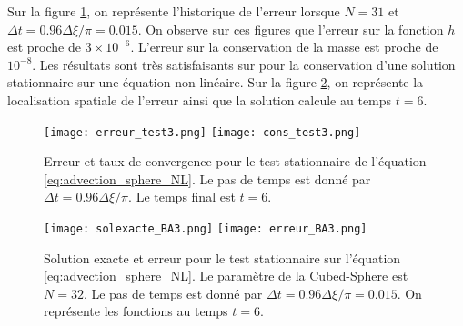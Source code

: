 Sur la figure \ref{fig:benartzi_test3_hist}, on représente l'historique de l'erreur lorsque $N=31$ et $\Delta t = 0.96 \Delta \xi / \pi = 0.015$. On observe sur ces figures que l'erreur sur la fonction $h$ est proche de $3 \times 10^{-6}$. L'erreur sur la conservation de la masse est proche de $10^{-8}$. Les résultats sont très satisfaisants sur pour la conservation d'une solution stationnaire sur une équation non-linéaire. Sur la figure \ref{fig:benartzi_test3_sol}, on représente la localisation spatiale de l'erreur ainsi que la solution calcule au temps $t=6$.

\begin{figure}[htbp]
\begin{center}
\texttt{[image: erreur\_test3.png]}
\texttt{[image: cons\_test3.png]}
\end{center}
\caption{Erreur et taux de convergence pour le test stationnaire de l'équation \eqref{eq:advection_sphere_NL}. Le pas de temps est donné par $\Delta t = 0.96 \Delta \xi / \pi$. Le temps final est $t=6$.}
\label{fig:benartzi_test3_hist}
\end{figure}

\begin{figure}[htbp]
\begin{center}
\texttt{[image: solexacte\_BA3.png]}
\texttt{[image: erreur\_BA3.png]}
\end{center}
\caption{Solution exacte et erreur pour le test stationnaire sur l'équation \eqref{eq:advection_sphere_NL}. Le paramètre de la Cubed-Sphere est $N=32$. Le pas de temps est donné par $\Delta t = 0.96 \Delta \xi / \pi = 0.015$. On représente les fonctions au temps $t=6$.}
\label{fig:benartzi_test3_sol}
\end{figure}


















